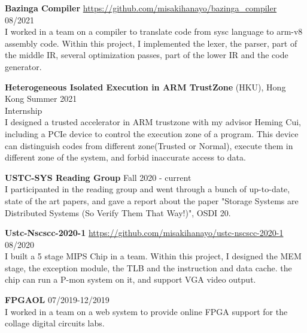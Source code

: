 \documentclass[margin, 10pt]{res}
\begin{document}
\begin{resume}
{\bf Bazinga Compiler} \url{https://github.com/misakihanayo/bazinga_compiler} \hfill 08/2021 \\
I worked in a team on a compiler to translate code from sysc language to arm-v8 assembly code.
Within this project, I implemented the lexer, the parser, part of the middle IR, several optimization passes, part of the lower IR and the code generator.

{\bf Heterogeneous Isolated Execution in ARM TrustZone} (HKU), Hong Kong  \hfill Summer 2021 \\
Internship\\
I designed a trusted accelerator in ARM trustzone with my advisor Heming Cui, including a PCIe device to 
control the execution zone of a program. This device can distinguish codes from different zone(Trusted or Normal), 
execute them in different zone of the system, and forbid inaccurate access to data.

{\bf USTC-SYS Reading Group} Fall 2020 - current \\
I participanted in the reading group and went through a bunch of up-to-date, state of the art papers,
 and gave a report about the paper "Storage Systems are Distributed Systems (So Verify Them That Way!)", OSDI 20.

{\bf Ustc-Nscscc-2020-1} \url{https://github.com/misakihanayo/ustc-nscscc-2020-1} \hfill 08/2020 \\
I built a 5 stage MIPS Chip in a team. Within this project, I designed the MEM stage,
 the exception module, the TLB and the instruction and data cache. the chip can run a P-mon system on it, and support 
 VGA video output.

{\bf FPGAOL} \hfill 07/2019-12/2019 \\
I worked in a team on a web system to provide online FPGA support for the collage digital circuits labs.


\end{resume}
\end{document}
